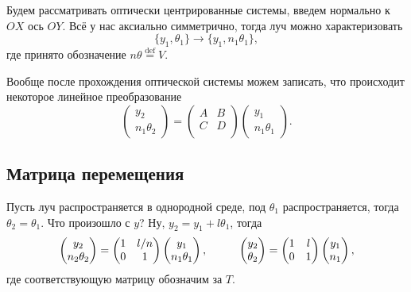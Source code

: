 Будем рассматривать оптически центрированные системы, введем нормально к $OX$ ось $OY$. Всё у нас аксиально симметрично, тогда луч можно характеризовать
\begin{equation*}
    \{y_1, \theta_1\} \to 
    \{y_1, n_1 \theta_1\},
\end{equation*}
где принято обозначение $n \theta \overset{\mathrm{def}}{=} V$.

Вообще после прохождения оптической системы можем записать, что происходит некоторое линейное преобразование
\begin{equation*}
    \begin{pmatrix}
        y_2 \\ n_1 \theta_2
    \end{pmatrix} = 
    \begin{pmatrix}
        A & B \\
        C & D \\
    \end{pmatrix}
    \begin{pmatrix}
        y_1 \\ n_1 \theta_1
    \end{pmatrix}.
\end{equation*}


\subsection*{Матрица перемещения}

Пусть луч распространяется в однородной среде, под $\theta_1$ распространяется, тогда $\theta_2 = \theta_1$. Что произошло с $y$? Ну, $y_2 = y_1 + l \theta_1$, тогда
\begin{equation}
    \begin{pmatrix}
        y_2 \\ n_2 \theta_2
    \end{pmatrix} = 
    \begin{pmatrix}
        1 & l/n \\
        0 & 1 \\
    \end{pmatrix} 
    \begin{pmatrix}
        y_1 \\ n_1 \theta_1 
    \end{pmatrix},
    \hspace{1 cm}
    \begin{pmatrix}
        y_2 \\ \theta_2
    \end{pmatrix} = 
    \begin{pmatrix}
        1 & l \\
        0 & 1 \\
    \end{pmatrix} 
    \begin{pmatrix}
        y_1 \\ n_1 
    \end{pmatrix}, 
\end{equation}
где соответствующую матрицу обозначим за $T$. 


